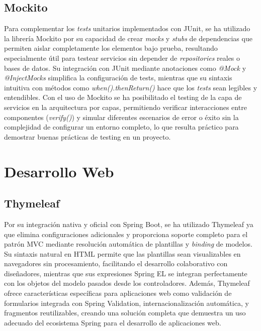 \subsection{Mockito}\label{mockito}
Para complementar los \emph{tests} unitarios implementados con JUnit, se ha utilizado la librería Mockito por su capacidad de crear \emph{mocks} y \emph{stubs} de dependencias que permiten aislar completamente los elementos bajo prueba, resultando especialmente útil para testear servicios sin depender de \emph{repositories} reales o bases de datos. Su integración con JUnit mediante anotaciones como \emph{@Mock} y \emph{@InjectMocks} simplifica la configuración de tests, mientras que su sintaxis intuitiva con métodos como \emph{when().thenReturn()} hace que los \emph{tests} sean legibles y entendibles. Con el uso de Mockito se ha posibilitado el testing de la capa de servicios en la arquitectura por capas, permitiendo verificar interacciones entre componentes (\emph{verify()}) y simular diferentes escenarios de error o éxito sin la complejidad de configurar un entorno completo, lo que resulta práctico para demostrar buenas prácticas de testing en un proyecto.

\section{Desarrollo Web}\label{desarrollo-web}

\subsection{Thymeleaf}\label{thymeleaf}
Por su integración nativa y oficial con Spring Boot, se ha utilizado Thymeleaf ya que elimina configuraciones adicionales y proporciona soporte completo para el patrón MVC mediante resolución automática de plantillas y \emph{binding} de modelos. Su sintaxis natural en HTML permite que las plantillas sean visualizables en navegadores sin procesamiento, facilitando el desarrollo colaborativo con diseñadores, mientras que sus expresiones Spring EL se integran perfectamente con los objetos del modelo pasados desde los controladores. Además, Thymeleaf ofrece características específicas para aplicaciones web como validación de formularios integrada con Spring Validation, internacionalización automática, y fragmentos reutilizables, creando una solución completa que demuestra un uso adecuado del ecosistema Spring para el desarrollo de aplicaciones web.

